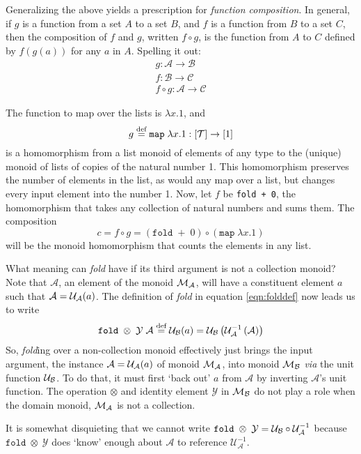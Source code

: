Generalizing the above yields a prescription for \emph{function composition}. In general, if $g$ is a function from a set $A$ to a set $B$, and $f$ is a function from $B$ to a set $C$, then the composition of $f$ and $g$, written $f\circ g$, is the function from $A$ to $C$ defined by $f(g(a))$ for any $a$ in $A$. Spelling it out:
\begin{align*}
  g:\mathcal{A}\rightarrow\mathcal{B}\\
  f:\mathcal{B}\rightarrow\mathcal{C}\\
  f\circ g:\mathcal{A}\rightarrow\mathcal{C}
\end{align*}


The function to map over the lists is $\lambda x.1$, and $$g\overset{\text{def}}{=}\mathtt{map}\;\lambda x.1:[\mathcal{T}]\rightarrow[1]$$ is a homomorphism from a list monoid of elements of any type to the (unique) monoid of lists of copies of the natural number 1. This homomorphism preserves the number of elements in the list, as would any map over a list, but changes every input element into the number 1. Now, let $f$ be \verb"fold + 0", the homomorphism that takes any collection of natural numbers and sums them. The composition
\[
  c=f\circ g= (\mathtt{fold}\;+\;0) \circ (\mathtt{map}\;\lambda x.1)
\]
will be the monoid homomorphism that counts the elements in any list.


What meaning can \emph{fold} have if its third argument is not a collection monoid? Note that $\mathcal{A}$, an element of the monoid $\mathcal{M}_{\mathcal{A}}$, will have a constituent element $a$ such that  $\mathcal{A}=\mathcal{U}_{\mathcal{A}}(a)$. The definition of \emph{fold} in equation \ref{eqn:folddef} now leads us to write
\begin{equation}
  \mathtt{fold}\;\otimes\;\mathcal{Y}\;\mathcal{A} \overset{\text{def}}{=}
        \mathcal{U}_{\mathcal{B}}(a)=
        \mathcal{U}_{\mathcal{B}}\left({\mathcal{U}}^{-1}_{\mathcal{A}}
        \left(\mathcal{A}\right)\right)
  \label{eqn:foldnoncollectiondef}
\end{equation}
So, \emph{fold}ing over a non-collection monoid effectively just brings the input argument, the instance $\mathcal{A}=\mathcal{U}_{\mathcal{A}}(a)$ of monoid $\mathcal{M}_{\mathcal{A}}$, into monoid $\mathcal{M}_{\mathcal{B}}$ \emph{via} the unit function $\mathcal{U}_{\mathcal{B}}$. To do that, it must first `back out' $a$ from $\mathcal{A}$ by inverting $\mathcal{A}$'s unit function. The operation $\otimes$ and identity element $\mathcal{Y}$ in $\mathcal{M}_{\mathcal{B}}$ do not play a role when the domain monoid, $\mathcal{M}_{\mathcal{A}}$ is not a collection.


It is somewhat disquieting that we cannot write $\mathtt{fold}\;\otimes\;\mathcal{Y} =
\mathcal{U}_{\mathcal{B}}\circ{\mathcal{U}}^{-1}_{\mathcal{A}}$
because $\mathtt{fold}\;\otimes\;\mathcal{Y}$ does `know' enough about $\mathcal{A}$ to reference ${\mathcal{U}}^{-1}_{\mathcal{A}}$.


